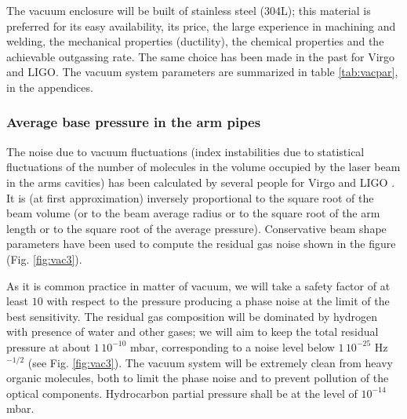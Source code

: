 The vacuum enclosure will be built of stainless steel (304L); this material is preferred for its easy availability, its price, the large experience in machining and welding, the mechanical properties (ductility), the chemical properties and the achievable outgassing rate. The same choice has been made in the past for Virgo and LIGO.
The vacuum system parameters are summarized in table \ref{tab:vacpar}, in the appendices.


\subsubsection{Average base pressure in the arm pipes} \label{average pressure}
%
The noise due to vacuum fluctuations (index instabilities due to statistical fluctuations of the number of molecules in the volume occupied by the laser beam in the arms cavities) has been calculated by several people for Virgo and LIGO \cite{cella08}. It is (at first approximation) inversely proportional to the square root of the beam volume (or to the beam average radius or to the square root of the arm length or to the square root of the average pressure).
Conservative beam shape parameters have been used to compute the residual gas noise shown in the figure (Fig. \ref{fig:vac3}).



As it is common practice in matter of vacuum, we will take a safety factor of at least $10$ with respect to the pressure producing a phase noise at the limit of the best sensitivity. The residual gas composition will be dominated by hydrogen with presence of water and other gases; we will aim to keep the total residual pressure at about $1\,10^{-10}$ mbar, corresponding to a noise level below $1\,10^{-25}$ Hz$^{-1/2}$ (see Fig. \ref{fig:vac3}). The vacuum system will be extremely clean from heavy organic molecules, both to limit the phase noise and to prevent pollution of the optical components. Hydrocarbon partial pressure shall be at the level of $10^{-14}$ mbar.

